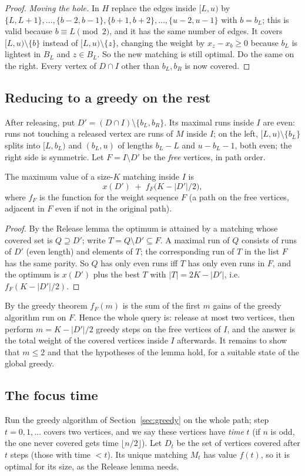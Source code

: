 \documentclass[11pt]{article}
\begin{document}
\begin{proof}
\emph{Moving the hole.} In $H$ replace the edges inside $[L,u)$ by
$\{L,L+1\},\dots,\{b-2,b-1\},\{b+1,b+2\},\dots,\{u-2,u-1\}$ with
$b=b_L$; this is valid because $b\equiv L\pmod2$, and it has the same number
of edges. It covers $[L,u)\setminus\{b\}$ instead of $[L,u)\setminus\{z\}$,
changing the weight by $x_z-x_b\ge0$ because $b_L$ is lightest in $B_L$
and $z\in B_L$. So the new matching is still optimal. Do the same on the right.
Every vertex of $D\cap I$ other than $b_L,b_R$ is now covered.
\end{proof}

\subsection{Reducing to a greedy on the rest}
After releasing, put $D'=(D\cap I)\setminus\{b_L,b_R\}$. Its maximal runs
inside $I$ are even: runs not touching a released vertex are runs of
$M$ inside $I$; on the left, $[L,u)\setminus\{b_L\}$ splits into
$[L,b_L)$ and $(b_L,u)$ of lengths $b_L-L$ and $u-b_L-1$, both even; the
right side is symmetric. Let $F=I\setminus D'$ be the \emph{free}
vertices, in path order.

\begin{theorembox}
The maximum value of a size-$K$ matching inside $I$ is
\[ x(D')\;+\;f_F\bigl(K-|D'|/2\bigr), \]
where $f_F$ is the function for the weight sequence $F$ (a path on the free
vertices, adjacent in $F$ even if not in the original path).
\end{theorembox}
\begin{proof}
By the Release lemma the optimum is attained by a matching whose covered set
is $Q\supseteq D'$; write $T=Q\setminus D'\subseteq F$. A maximal run of $Q$
consists of runs of $D'$ (even length) and elements of $T$; the corresponding
run of $T$ in the list $F$ has the same parity. So $Q$ has only even runs iff
$T$ has only even runs in $F$, and the optimum is $x(D')$ plus the best
$T$ with $|T|=2K-|D'|$, i.e.\ $f_F(K-|D'|/2)$.
\end{proof}
By the greedy theorem $f_F(m)$ is the sum of the first $m$ gains of
the greedy algorithm run on $F$. Hence the whole query is: release at most two
vertices, then perform $m=K-|D'|/2$ greedy steps on the free vertices of
$I$, and the answer is the total weight of the covered vertices inside $I$
afterwards. It remains to show that $m\le2$ and that the hypotheses of the
lemma hold, for a suitable state of the global greedy.

\subsection{The focus time}
Run the greedy algorithm of Section~\ref{sec:greedy} on the whole path; step
$t=0,1,\dots$ covers two vertices, and we say these vertices have
\emph{time} $t$ (if $n$ is odd, the one never covered gets time $\lfloor n/2\rfloor$).
Let $D_t$ be the set of vertices covered after $t$ steps (those with time
$<t$). Its unique matching $M_t$ has value $f(t)$, so it is
optimal for its size, as the Release lemma needs.
\end{document}

